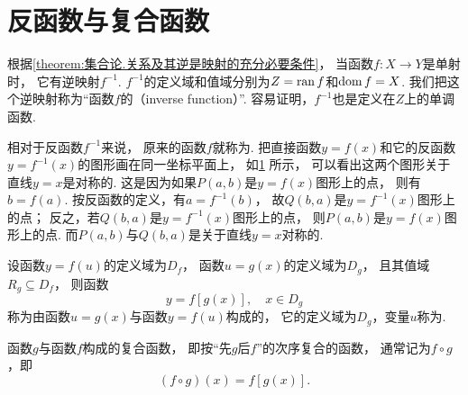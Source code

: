 \section{反函数与复合函数}
根据\cref{theorem:集合论.关系及其逆是映射的充分必要条件}，
当函数\(f\colon X \to Y\)是单射时，
它有逆映射\(f^{-1}\).
\(f^{-1}\)的定义域和值域分别为\(Z=\operatorname{ran} f\)和\(\operatorname{dom} f=X\).
我们把这个逆映射称为“函数\(f\)的（inverse function）”.
容易证明，\(f^{-1}\)也是定义在\(Z\)上的单调函数.

相对于反函数\(f^{-1}\)来说，
原来的函数\(f\)就称为.
把直接函数\(y=f(x)\)和它的反函数\(y=f^{-1}(x)\)的图形画在同一坐标平面上，
如\cref{figure:函数.直接函数与反函数的图形的对称性} 所示，
可以看出这两个图形关于直线\(y=x\)是对称的.
这是因为如果\(P(a,b)\)是\(y=f(x)\)图形上的点，
则有\(b=f(a)\).
按反函数的定义，有\(a=f^{-1}(b)\)，
故\(Q(b,a)\)是\(y=f^{-1}(x)\)图形上的点；
反之，若\(Q(b,a)\)是\(y=f^{-1}(x)\)图形上的点，
则\(P(a,b)\)是\(y=f(x)\)图形上的点.
而\(P(a,b)\)与\(Q(b,a)\)是关于直线\(y=x\)对称的.

\begin{figure}[ht]
	\centering
	\caption{}\label{figure:函数.直接函数与反函数的图形的对称性}
\end{figure}

\begin{definition}
设函数\(y=f(u)\)的定义域为\(D_f\)，
函数\(u=g(x)\)的定义域为\(D_g\)，
且其值域\(R_g \subseteq D_f\)，
则函数\[
	y = f[g(x)],
	\quad x \in D_g
\]
称为由函数\(u=g(x)\)与函数\(y=f(u)\)构成的，
它的定义域为\(D_g\)，变量\(u\)称为.

函数\(g\)与函数\(f\)构成的复合函数，
即按“先\(g\)后\(f\)”的次序复合的函数，
通常记为\(f \circ g\)，即\[
	(f \circ g)(x) = f[g(x)].
\]
\end{definition}

